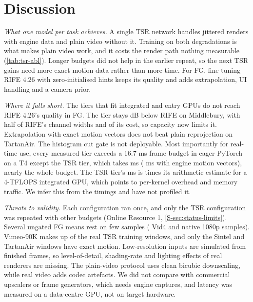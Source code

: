 \documentclass[pdflatex,sn-mathphys-num,iicol]{sn-jnl}
\begin{document}
\section{Discussion}\label{sec:discussion}

\emph{What one model per task achieves.} A single TSR network handles jittered renders with engine data and plain video without it. Training on both degradations is what makes plain video work, and it costs the render path nothing measurable (\cref{tab:tsr-abl}). Longer budgets did not help in the earlier repeat, so the next TSR gains need more exact-motion data rather than more time. For FG, fine-tuning RIFE 4.26 with zero-initialised hints keeps its quality and adds extrapolation, UI handling and a camera prior.

\emph{Where it falls short.} The tiers that fit integrated and entry GPUs do not reach RIFE 4.26's quality in FG. The  tier stays  dB below RIFE on Middlebury, with half of RIFE's channel widths and  of its cost, so capacity now limits it. Extrapolation with exact motion vectors does not beat plain reprojection on TartanAir. The histogram cut gate is not deployable. Most importantly for real-time use, every measured tier exceeds a 16.7 ms frame budget in eager PyTorch on a T4 except the TSR  tier, which takes  ms ( ms with engine motion vectors), nearly the whole budget. The TSR  tier's  ms is  times its arithmetic estimate for a 4-TFLOPS integrated GPU, which points to per-kernel overhead and memory traffic. We infer this from the timings and have not profiled it.

\emph{Threats to validity.} Each configuration ran once, and only the TSR configuration was repeated with other budgets (Online Resource 1, \cref{S-sec:status-limits}). Several ungated FG means rest on few samples ( Vid4 and  native 1080p samples). Vimeo-90K makes up  of the real TSR training windows, and only the Sintel and TartanAir windows have exact motion. Low-resolution inputs are simulated from finished frames, so level-of-detail, shading-rate and lighting effects of real renderers are missing. The plain-video protocol uses clean bicubic downscaling, while real video adds codec artefacts. We did not compare with commercial upscalers or frame generators, which needs engine captures, and latency was measured on a data-centre GPU, not on target hardware.
\end{document}
